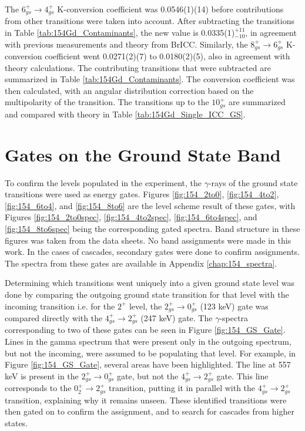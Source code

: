 \afterpage{\clearpage}

The $6_{gs}^+\rightarrow 4_{gs}^+$ K-conversion coefficient was 0.0546(1)(14) before contributions from other transitions were taken into account. After subtracting the transitions in Table \ref{tab:154Gd_Contaminants}, the new value is 0.0335(1)$^{+11}_{-10}$, in agreement with previous measurements and theory from BrICC\citep{kibedi08:_BRICC}. Similarly, the $8_{gs}^+\rightarrow 6_{gs}^+$ K-conversion coefficient went 0.0271(2)(7) to 0.0180(2)(5), also in agreement with theory calculations. The contributing transitions that were subtracted are summarized in Table \ref{tab:154Gd_Contaminants}.  The conversion coefficient was then calculated, with an angular distribution correction based on the multipolarity of the transition. The transitions up to the $10_{gs}^+$ are summarized and compared with theory in Table \ref{tab:154Gd_Single_ICC_GS}.

\afterpage{\clearpage}

\section{Gates on the Ground State Band}
\label{sec:154GS_Gates}

To confirm the levels populated in the experiment, the $\gamma$-rays of the ground state transitions were used as energy gates. Figures \ref{fig:154_2to0}, \ref{fig:154_4to2}, \ref{fig:154_6to4}, and \ref{fig:154_8to6} are the level scheme result of these gates, with Figures \ref{fig:154_2to0spec}, \ref{fig:154_4to2spec}, \ref{fig:154_6to4spec}, and \ref{fig:154_8to6spec} being the corresponding gated spectra. Band structure in these figures was taken from the data sheets\citep{reich09:_nds_154}. No band assignments were made in this work. In the cases of cascades, secondary gates were done to confirm assignments. The spectra from these gates are available in Appendix \ref{chap:154_spectra}.

Determining which transitions went uniquely into a given ground state level was done by comparing the outgoing ground state transition for that level with the incoming transition i.e. for the $2^+$ level, the $2_{gs}^+\rightarrow 0_{gs}^+$ (123 keV) gate was compared directly with the $4_{gs}^+\rightarrow 2_{gs}^+$ (247 keV) gate. The $\gamma$-spectra corresponding to two of these gates can be seen in Figure \ref{fig:154_GS_Gate}. Lines in the gamma spectrum that were present only in the outgoing spectrum, but not the incoming, were assumed to be populating that level. For example, in Figure \ref{fig:154_GS_Gate}, several areas have been highlighted. The line at 557 keV is present in the $2_{gs}^+\rightarrow 0_{gs}^+$ gate, but not the $4_{gs}^+\rightarrow 2_{gs}^+$ gate. This line corresponds to the $0^+_{2}\rightarrow 2^+_{gs}$ transition, putting it in parallel with the $4_{gs}^+\rightarrow 2_{gs}^+$ transition, explaining why it remains unseen. These identified transitions were then gated on to confirm the assignment, and to search for cascades from higher states.


